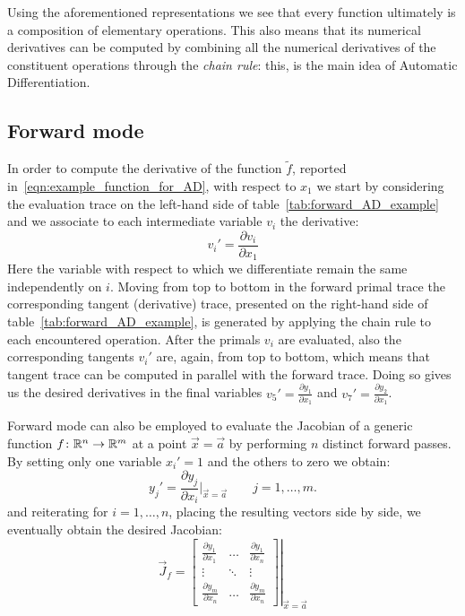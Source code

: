 Using the aforementioned representations we see that every function ultimately is a composition of elementary operations. This also means that its numerical derivatives can be computed by combining all the numerical derivatives of the constituent operations through the \emph{chain rule}: this, is the main idea of Automatic Differentiation.



\subsection{Forward mode}
\label{subsec:forward_mode_AD}

In order to compute the derivative of the function $\tilde{f}$, reported in~\eqref{eqn:example_function_for_AD}, with respect to $x_1$ we start by considering the evaluation trace on the left-hand side of table~\ref{tab:forward_AD_example} and we associate to each intermediate variable $ v_i$ the derivative:
\[
	v_i' = \frac{\partial v_i}{\partial x_1}
\]
Here the variable with respect to which we differentiate remain the same independently on $i$.
Moving from top to bottom in the forward primal trace the corresponding tangent (derivative) trace, presented on the right-hand side of table~\ref{tab:forward_AD_example}, is generated by applying the chain rule to each encountered operation. After the primals $v_i$ are evaluated, also the corresponding tangents $v_i'$ are, again, from top to bottom, which means that tangent trace can be computed in parallel with the forward trace. Doing so gives us the desired derivatives in the final variables $v_5' = \frac{\partial y_1}{\partial x_1}$ and $v_7' = \frac{\partial y_2}{\partial x_1}$.

\medskip
Forward mode can also be employed to evaluate the Jacobian of a generic function $f \colon \mathbb{R}^n \to \mathbb{R}^m$ at a point $\vec{x} = \vec{a}$ by performing $n$ distinct forward passes. By setting only one variable $x_i'=1$ and the others to zero we obtain:
\[
	y_j' = \frac{\partial y_j}{\partial x_i}\bigg|_{\vec{x}=\vec{a}} \qquad j=1,\dots,m.
\]
and reiterating for $i=1,\dots,n$, placing the resulting vectors side by side, we eventually obtain the desired Jacobian:
\[
\vec{J}_f =
\left.
\begin{bmatrix}
	\frac{\partial y_1}{\partial x_1} &  \dots  & \frac{\partial y_1}{\partial x_n}  \\
	\vdots							  & \ddots  & \vdots							 \\
	\frac{\partial y_m}{\partial x_n} &  \dots  & \frac{\partial y_m}{\partial x_n}
\end{bmatrix}
\right|_{\vec{x} = \vec{a}}
\]

